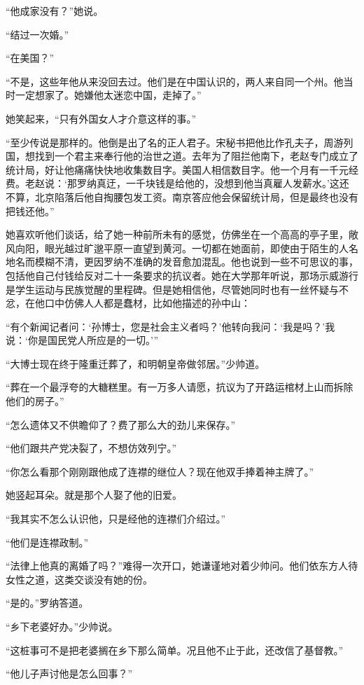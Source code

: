 \par “他成家没有？”她说。
\par “结过一次婚。”
\par “在美国？”
\par “不是，这些年他从来没回去过。他们是在中国认识的，两人来自同一个州。他当时一定想家了。她嫌他太迷恋中国，走掉了。”
\par 她笑起来，“只有外国女人才介意这样的事。”
\par “至少传说是那样的。他倒是出了名的正人君子。宋秘书把他比作孔夫子，周游列国，想找到一个君主来奉行他的治世之道。去年为了阻拦他南下，老赵专门成立了统计局，好让他痛痛快快地收集数目字。美国人相信数目字。他一个月有一千元经费。老赵说：‘那罗纳真迂，一千块钱是给他的，没想到他当真雇人发薪水。’这还不算，北京陷落后他自掏腰包发工资。南京答应他会保留统计局，但是最终也没有把钱还他。”
\par 她喜欢听他们谈话，给了她一种前所未有的感觉，仿佛坐在一个高高的亭子里，敞风向阳，眼光越过旷邈平原一直望到黄河。一切都在她面前，即使由于陌生的人名地名而模糊不清，更因罗纳不准确的发音愈加混乱。他也说到一些不可思议的事，包括他自己付钱给反对二十一条要求的抗议者。她在大学那年听说，那场示威游行是学生运动与民族觉醒的里程碑。但是她相信他，尽管她同时也有一丝怀疑与不忿，在他口中仿佛人人都是蠢材，比如他描述的孙中山：
\par “有个新闻记者问：‘孙博士，您是社会主义者吗？’他转向我问：‘我是吗？’我说：‘你是国民党人所应是的一切。’”
\par “大博士现在终于隆重迁葬了，和明朝皇帝做邻居。”少帅道。
\par “葬在一个最浮夸的大糖糕里。有一万多人请愿，抗议为了开路运棺材上山而拆除他们的房子。”
\par “怎么遗体又不供瞻仰了？费了那么大的劲儿来保存。”
\par “他们跟共产党决裂了，不想仿效列宁。”
\par “你怎么看那个刚刚跟他成了连襟的继位人？现在他双手捧着神主牌了。”
\par 她竖起耳朵。就是那个人娶了他的旧爱。
\par “我其实不怎么认识他，只是经他的连襟们介绍过。”
\par “他们是连襟政制。”
\par “法律上他真的离婚了吗？”难得一次开口，她谦谨地对着少帅问。他们依东方人待女性之道，这类交谈没有她的份。
\par “是的。”罗纳答道。
\par “乡下老婆好办。”少帅说。
\par “这桩事可不是把老婆搁在乡下那么简单。况且他不止于此，还改信了基督教。”
\par “他儿子声讨他是怎么回事？”
